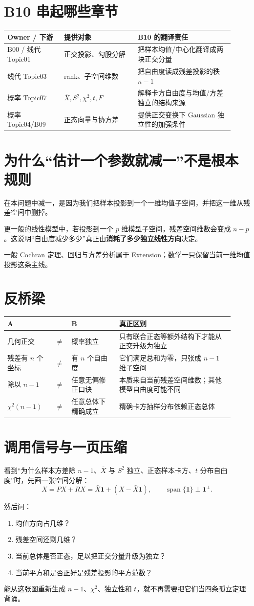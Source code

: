\documentclass[profile=standard]{ipara-handbook}
\begin{document}
\section{B10 串起哪些章节}
\begin{tabular}{p{0.23\linewidth}p{0.30\linewidth}p{0.39\linewidth}}
\hline
Owner / 下游 & 提供对象 & B10 的翻译责任\\
\hline
B00 / 线代 Topic01 & 正交投影、勾股分解 & 把样本均值/中心化翻译成两块正交分量\\
线代 Topic03 & rank、子空间维数 & 把自由度读成残差投影的秩 $n-1$\\
概率 Topic07 & $\bar X,S^2,\chi^2,t,F$ & 解释卡方自由度与均值/方差独立的结构来源\\
概率 Topic04/B09 & 正态向量与协方差 & 提供正交变换下 Gaussian 独立性的加强条件\\
\hline
\end{tabular}

\section{为什么“估计一个参数就减一”不是根本规则}
在本问题中减一，是因为我们把样本投影到一个一维均值子空间，并把这一维从残差空间中删掉。

更一般的线性模型中，若投影到一个 $p$ 维模型子空间，残差空间维数会变成 $n-p$。这说明“自由度减少多少”真正由\textbf{消耗了多少独立线性方向}决定。

一般 Cochran 定理、回归与方差分析属于 Extension；数学一只保留当前一维均值投影这条主线。

\section{反桥梁}
\begin{tabular}{p{0.20\linewidth}p{0.04\linewidth}p{0.20\linewidth}p{0.48\linewidth}}
\hline
A & & B & 真正区别\\
\hline
几何正交 & $\neq$ & 概率独立 & 只有联合正态等额外结构下才能从正交升级为独立\\
残差有 $n$ 个坐标 & $\neq$ & 有 $n$ 个自由度 & 它们满足总和为零，只张成 $n-1$ 维子空间\\
除以 $n-1$ & $\neq$ & 任意无偏修正口诀 & 本质来自当前残差空间维数；其他模型自由度可能不同\\
$\chi^2(n-1)$ & $\neq$ & 任意总体下精确成立 & 精确卡方抽样分布依赖正态总体\\
\hline
\end{tabular}

\section{调用信号与一页压缩}
看到“为什么样本方差除 $n-1$、$\bar X$ 与 $S^2$ 独立、正态样本卡方、$t$ 分布自由度”时，先画一张空间分解：
\[
\boxed{
X
=PX+RX
=\bar X\mathbf1+(X-\bar X\mathbf1),
\qquad
\operatorname{span}\{\mathbf1\}\perp\mathbf1^\perp.
}
\]

然后问：
\begin{enumerate}
\item 均值方向占几维？
\item 残差空间还剩几维？
\item 当前总体是否正态，足以把正交分量升级为独立？
\item 当前平方和是否正好是残差投影的平方范数？
\end{enumerate}

能从这张图重新生成 $n-1$、$\chi^2$、独立性和 $t$，就不再需要把它们当四条孤立定理背诵。
\end{document}
